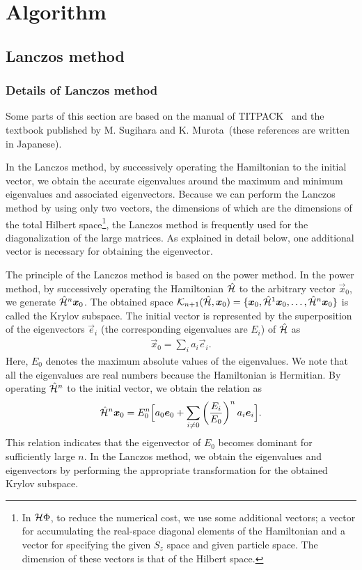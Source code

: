 \chapter{ Algorithm}
\label{Ch:algorithm}
\section{Lanczos method}
\label{Ch:Lanczos}
\subsection{Details of Lanczos method}
Some parts of this section are based on the manual
of TITPACK~\cite{titpack} and the textbook published by M. Sugihara and 
K. Murota~\cite{SugiharaMurota_en}(these references are written in Japanese).

In the Lanczos method, by successively operating the Hamiltonian 
to the initial vector, we obtain the accurate eigenvalues around
the maximum and minimum eigenvalues and associated eigenvectors.  
Because we can perform the Lanczos method by using only two
vectors, the dimensions of which are the dimensions of the total Hilbert space\footnote{In $\mathcal{H} \Phi$, 
to reduce the numerical cost,
we use some additional vectors;
a vector for accumulating the 
real-space diagonal elements of the Hamiltonian and
a vector for specifying the given $S_{z}$ space and given particle space.
The dimension of these vectors is that of the Hilbert space.},
the Lanczos method is frequently used for the 
diagonalization of the large matrices.
As explained in detail below,
one additional vector is necessary for
obtaining the eigenvector.

The principle of the Lanczos method is
based on the power method.
In the power method,
by successively operating the Hamiltonian $\hat{\mathcal{H}}$ to the
arbitrary vector $\vec{x}_{0}$, we generate $\hat{\mathcal{H}}^{n}\boldsymbol x_{0}$.
The obtained space 
$\mathcal{K}_{n+1}(\hat{\mathcal{H}},\boldsymbol x_{0})=\{\boldsymbol x_{0},\hat{\mathcal{H}}^{1}\boldsymbol x_{0},\dots,\hat{\mathcal{H}}^{n}\boldsymbol x_{0}\}$
is called the Krylov subspace.
The initial vector is represented by the superposition 
of the eigenvectors 
$\vec{e}_{i}$ (the corresponding eigenvalues are $E_{i}$) of $\hat{\mathcal{H}}$ as 
\begin{align}
\vec{x}_{0}=\sum_{i}a_{i}\vec{e}_{i}.
\end{align}
Here, $E_{0}$ denotes the maximum absolute values of the eigenvalues.
We note that all the eigenvalues are real numbers because the Hamiltonian is Hermitian.
By operating $\hat{\mathcal{H}}^{n}$ to the initial vector,
we obtain the relation as
\begin{align}
\hat{\mathcal{H}}^{n}\boldsymbol x_{0}=E_{0}^{n}\Big[ a_{0}\boldsymbol e_{0}+\sum_{i\neq0}\left(\frac{E_{i}}{E_{0}}\right)^na_{i}\boldsymbol e_{i}\Big].
\end{align}
This relation indicates that
the eigenvector of $E_{0}$ becomes dominant for sufficiently large $n$. 
In the Lanczos method,
we obtain the eigenvalues and eigenvectors 
by performing the appropriate transformation for the obtained Krylov subspace.

